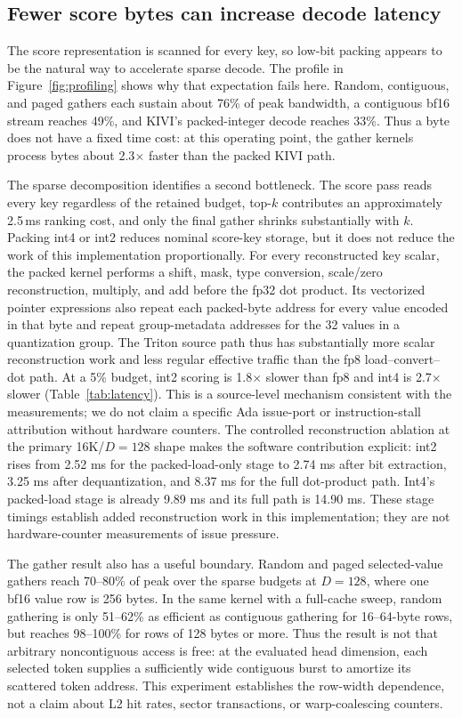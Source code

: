 \documentclass[sigplan,anonymous,review,nonacm]{acmart}
\begin{document}
\subsection{Fewer score bytes can increase decode latency}
The score representation is scanned for every key, so low-bit packing appears to be
the natural way to accelerate sparse decode. The profile in
Figure~\ref{fig:profiling} shows why that expectation fails here. Random, contiguous,
and paged gathers each sustain about 76\% of peak bandwidth, a contiguous bf16 stream
reaches 49\%, and KIVI's packed-integer decode reaches 33\%. Thus a byte does not have
a fixed time cost: at this operating point, the gather kernels process bytes about
2.3$\times$ faster than the packed KIVI path.

The sparse decomposition identifies a second bottleneck. The score pass reads every
key regardless of the retained budget, top-$k$ contributes an approximately 2.5\,ms
ranking cost, and only the final gather shrinks substantially with $k$. Packing int4
or int2 reduces nominal score-key storage, but it does not reduce the work of this
implementation proportionally. For every reconstructed key scalar, the packed kernel
performs a shift, mask, type conversion, scale/zero reconstruction, multiply, and add
before the fp32 dot product. Its vectorized pointer expressions also repeat each
packed-byte address for every value encoded in that byte and repeat group-metadata
addresses for the 32 values in a quantization group. The Triton source path thus has
substantially more scalar reconstruction work and less regular effective traffic than
the fp8 load--convert--dot path. At a 5\% budget, int2 scoring is 1.8$\times$ slower
than fp8 and int4 is 2.7$\times$ slower (Table~\ref{tab:latency}). This is a
source-level mechanism consistent with the measurements; we do not claim a specific
Ada issue-port or instruction-stall attribution without hardware counters.
The controlled reconstruction ablation at the primary 16K/$D{=}128$ shape makes the
software contribution explicit: int2 rises from 2.52 ms for the packed-load-only
stage to 2.74 ms after bit extraction, 3.25 ms after dequantization, and 8.37 ms
for the full dot-product path. Int4's packed-load stage is already 9.89 ms and its
full path is 14.90 ms. These stage timings establish added reconstruction work in
this implementation; they are not hardware-counter measurements of issue pressure.

The gather result also has a useful boundary. Random and paged selected-value gathers
reach 70--80\% of peak over the sparse budgets at $D{=}128$, where one bf16 value row is 256 bytes. In the
same kernel with a full-cache sweep, random gathering is only 51--62\% as efficient
as contiguous gathering for 16--64-byte rows, but reaches 98--100\% for rows of 128
bytes or more. Thus the result is not that arbitrary noncontiguous access is free:
at the evaluated head dimension, each selected token supplies a sufficiently wide
contiguous burst to amortize its scattered token address. This experiment establishes
the row-width dependence, not a claim about L2 hit rates, sector transactions, or
warp-coalescing counters.
\end{document}
